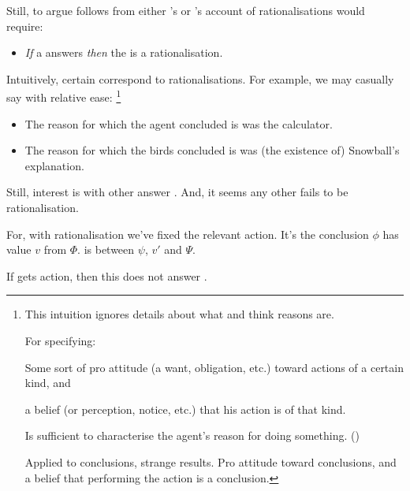 \begin{note}
  Still, to argue \issueInclusion{} follows from either \citeauthor{Davidson:1963aa}'s or \citeauthor{Hieronymi:2011aa}'s account of rationalisations would require:

  \begin{itemize}
  \item
    \emph{If} a \ros{} answers \qWhy{} \emph{then} the \ros{} is a rationalisation.
  \end{itemize}

  Intuitively, certain \ros{} correspond to rationalisations.
  For example, we may casually say with relative ease:%
  \footnote{
    This intuition ignores details about what \citeauthor{Davidson:1963aa} and \citeauthor{Hieronymi:2011aa} think reasons are.

    For \citeauthor{Davidson:1963aa} specifying:
    \begin{enumerate*}[label=(\alph*), ref=(\alph*)]
    \item
      Some sort of pro attitude (a want, obligation, etc.) toward actions of a certain kind, and
    \item
      a belief (or perception, notice, etc.) that his action is of that kind.
    \end{enumerate*}
    Is sufficient to characterise the agent's reason for doing something.
    (\citeyear[Cf.][685,686]{Davidson:1963aa})

    Applied to conclusions, strange results.
    Pro attitude toward conclusions, and a belief that performing the action is a conclusion.
  }

  \begin{itemize}[noitemsep]
  \item
    The reason for which the agent concluded \propM{\gistCalcEq{}} is  was the calculator.
  \item
    The reason for which the birds concluded  is  was (the existence of) Snowball's explanation.
  \end{itemize}

  Still, interest is with other  answer \qWhy{}.
  And, it seems any other \ros{} fails to be rationalisation.

  For, with rationalisation we've fixed the relevant action.
  It's the conclusion \(\phi\) has value \(v\) from \(\Phi\).
  \ros{} is between \(\psi\), \(v'\) and \(\Psi\).

  If \ros{} gets action, then this does not answer \qWhy{}.


\end{note}
